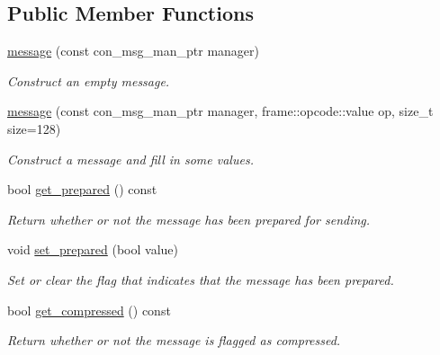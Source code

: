 \subsection*{Public Member Functions}
\begin{DoxyCompactItemize}
\item 
\mbox{\hyperlink{classwebsocketpp_1_1message__buffer_1_1message_ae3cb82d2876aebcf9909d87858e0f4af}{message}} (const con\+\_\+msg\+\_\+man\+\_\+ptr manager)
\begin{DoxyCompactList}\small\item\em Construct an empty message. \end{DoxyCompactList}\item 
\mbox{\label{classwebsocketpp_1_1message__buffer_1_1message_a09c574d6d92b28629bed43bbbc674db1}} 
\mbox{\hyperlink{classwebsocketpp_1_1message__buffer_1_1message_a09c574d6d92b28629bed43bbbc674db1}{message}} (const con\+\_\+msg\+\_\+man\+\_\+ptr manager, frame\+::opcode\+::value op, size\+\_\+t size=128)
\begin{DoxyCompactList}\small\item\em Construct a message and fill in some values. \end{DoxyCompactList}\item 
bool \mbox{\hyperlink{classwebsocketpp_1_1message__buffer_1_1message_ac1f947fbff19cf93d6fc19e21aff0e10}{get\+\_\+prepared}} () const
\begin{DoxyCompactList}\small\item\em Return whether or not the message has been prepared for sending. \end{DoxyCompactList}\item 
void \mbox{\hyperlink{classwebsocketpp_1_1message__buffer_1_1message_a9b17bf5adb8607c44774a96b340ee55b}{set\+\_\+prepared}} (bool value)
\begin{DoxyCompactList}\small\item\em Set or clear the flag that indicates that the message has been prepared. \end{DoxyCompactList}\item 
bool \mbox{\hyperlink{classwebsocketpp_1_1message__buffer_1_1message_a2ed58d11ccdedad8b6f9123897cff071}{get\+\_\+compressed}} () const
\begin{DoxyCompactList}\small\item\em Return whether or not the message is flagged as compressed. \end{DoxyCompactList}\item 

\end{DoxyCompactItemize}
